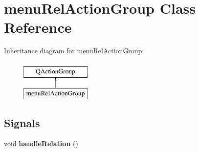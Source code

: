 \hypertarget{classmenu_rel_action_group}{}\section{menu\+Rel\+Action\+Group Class Reference}
\label{classmenu_rel_action_group}
Inheritance diagram for menu\+Rel\+Action\+Group\+:\begin{figure}[H]
\begin{center}
\leavevmode
\includegraphics[height=2.000000cm]{classmenu_rel_action_group}
\end{center}
\end{figure}
\subsection*{Signals}
\begin{DoxyCompactItemize}
\item 
\mbox{\label{classmenu_rel_action_group_a35a2675819196b79afc8f0c3701b10ed}} 
void {\bfseries handle\+Relation} ()
\end{DoxyCompactItemize}

